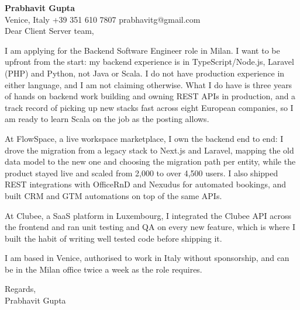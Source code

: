 \documentclass[a4paper,10.5pt]{article}
\begin{document}
\textbf{Prabhavit Gupta}\\
Venice, Italy \textbar{} +39 351 610 7807 \textbar{} prabhavitg@gmail.com\\[10pt]
Dear Client Server team,

I am applying for the Backend Software Engineer role in Milan. I want to be upfront from the start: my backend experience is in TypeScript/Node.js, Laravel (PHP) and Python, not Java or Scala. I do not have production experience in either language, and I am not claiming otherwise. What I do have is three years of hands on backend work building and owning REST APIs in production, and a track record of picking up new stacks fast across eight European companies, so I am ready to learn Scala on the job as the posting allows.

At FlowSpace, a live workspace marketplace, I own the backend end to end: I drove the migration from a legacy stack to Next.js and Laravel, mapping the old data model to the new one and choosing the migration path per entity, while the product stayed live and scaled from 2,000 to over 4,500 users. I also shipped REST integrations with OfficeRnD and Nexudus for automated bookings, and built CRM and GTM automations on top of the same APIs.

At Clubee, a SaaS platform in Luxembourg, I integrated the Clubee API across the frontend and ran unit testing and QA on every new feature, which is where I built the habit of writing well tested code before shipping it.

I am based in Venice, authorised to work in Italy without sponsorship, and can be in the Milan office twice a week as the role requires.

Regards,\\
Prabhavit Gupta
\end{document}
